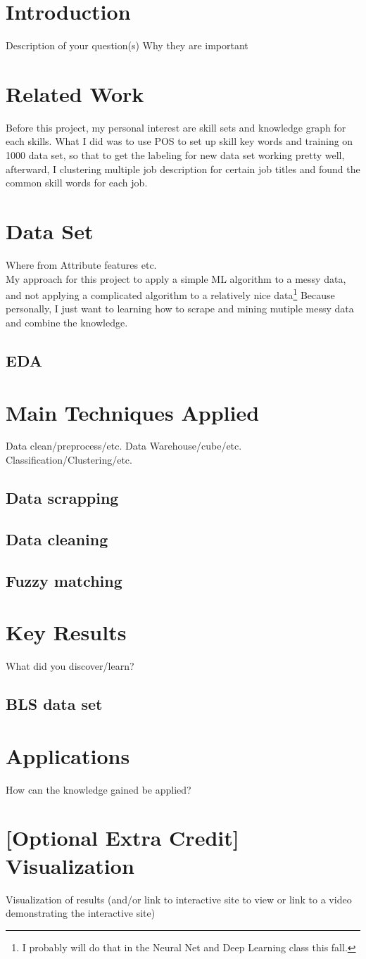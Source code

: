 



\section{Introduction} 
 Description of your question(s) Why they are important
\section{Related Work}
Before this project, my personal interest are skill sets and knowledge graph for each skills. What I did was to use POS to set up skill key words and training on 1000 data set, so that to get the labeling for new data set working pretty well, afterward, I clustering multiple job description for certain job titles and found the common  skill words for each job. 
\section{Data Set}
Where from
Attribute features
etc.\\
My approach for this project to apply a simple ML algorithm to a messy data, and not applying a complicated algorithm to a relatively nice data\footnote{I probably will do that in the Neural Net and Deep Learning class this fall.} Because personally, I just want to learning how to scrape and mining mutiple messy data and combine the knowledge. 
\subsection{EDA}
\section{Main Techniques Applied}
Data clean/preprocess/etc.
Data Warehouse/cube/etc.
Classification/Clustering/etc.
\subsection{Data scrapping}
\subsection{Data cleaning}
\subsection{Fuzzy matching}

\section{Key Results}
What did you discover/learn?
\subsection{BLS data set}
\section{Applications}
How can the knowledge gained be applied?
\section{ [Optional Extra Credit] Visualization}
Visualization of results (and/or link to interactive site to view or link to a video
demonstrating the interactive site)







